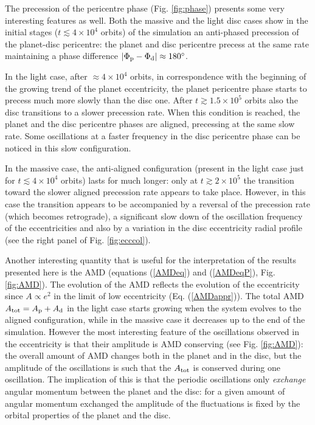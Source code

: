 \documentclass[usenatbib,a4paper,times,fleqn]{mnras}
\begin{document}
The precession of the pericentre phase (Fig. \ref{fig:phase}) presents some very interesting features as well. Both the massive and the light disc cases show in the initial stages ($t\lesssim 4\times 10^4$ orbits) of the simulation an anti-phased precession of the planet-disc pericentre: the planet and disc pericentre precess at the same rate maintaining a phase difference $|\Phi_{\rm p}-\Phi_{\rm d}|\approx 180^\circ$. 

In the light case, after $\approx 4\times 10^4$ orbits, in correspondence with the beginning of the growing trend of the planet eccentricity, the planet pericentre phase starts to precess much more slowly than the disc one. After $t\gtrsim 1.5\times 10^5$ orbits also the disc transitions to a slower precession rate. When this condition is reached, the planet and the disc pericentre phases are aligned, precessing at the same slow rate. Some oscillations at a faster frequency in the disc pericentre phase can be noticed in this slow configuration.

In the massive case, the anti-aligned configuration (present in the light case just for $t\lesssim 4\times 10^4$ orbits) lasts for much longer: only at $t\gtrsim 2\times 10^5$ the transition toward the slower aligned precession rate appears to take place. However, in this case the transition appears to be accompanied by a reversal of the precession rate (which becomes retrograde), a significant slow down of the oscillation frequency of the eccentricities and also by a variation in the disc eccentricity radial profile (see the right panel of Fig. \ref{fig:ecccol}). 

Another interesting quantity that is useful for the interpretation of the results presented here is the AMD (equations (\ref{AMDeq}) and (\ref{AMDeqP}), Fig. \ref{fig:AMD}).
The evolution of the AMD reflects the evolution of the eccentricity since $A \propto e^2$ in the limit of low eccentricity (Eq.
(\ref{AMDappr})). The total AMD $A_{\rm tot}=A_{\rm p}+A_{\rm d}$ in the light case starts growing when the system evolves to the aligned configuration, while in the massive case it decreases up to the end of the simulation. 
However the most interesting feature of the oscillations observed in the eccentricity is that their amplitude is AMD conserving (see Fig. \ref{fig:AMD}): the overall amount of AMD changes both in the planet and in the disc, but the amplitude of the oscillations is such that the $A_{\rm tot}$ is conserved during one oscillation. The implication of this is that the periodic oscillations only {\it exchange} angular momentum between the planet and the disc: for a given amount of angular momentum exchanged the amplitude of the fluctuations is fixed by the orbital properties of the planet and the disc. 
\end{document}
